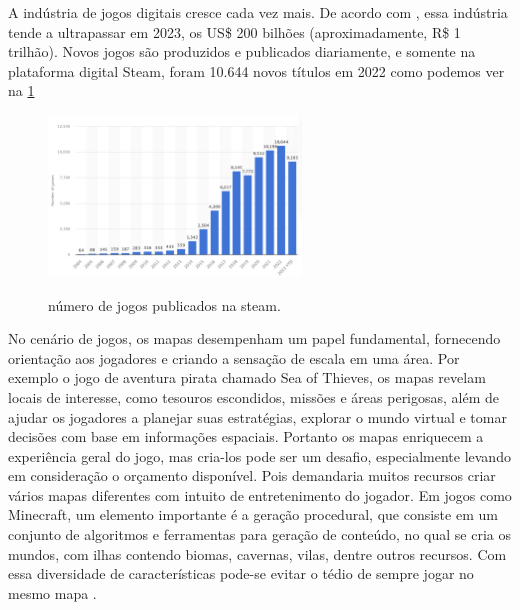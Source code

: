 A indústria de jogos digitais cresce cada vez mais. De acordo com , essa indústria tende a ultrapassar em 2023, os US\$ 200 bilhões (aproximadamente, R\$ 1 trilhão). Novos jogos são produzidos e publicados diariamente, e somente na plataforma digital Steam, foram 10.644 novos títulos em 2022 como podemos ver na \cref{fig:steam_publishes} \space

\begin{figure}[!ht]
	\centering
    \caption{número de jogos publicados na steam.}
	\includegraphics[width=0.6\textwidth]{figures/steam_sales.png}
	\label{fig:steam_publishes}
\end{figure}


No cenário de jogos, os mapas desempenham um papel fundamental, fornecendo orientação aos jogadores e criando a sensação de escala em uma área. Por exemplo o jogo de aventura pirata chamado Sea of Thieves, os mapas revelam locais de interesse, como tesouros escondidos, missões e áreas perigosas, além de ajudar os jogadores a planejar suas estratégias, explorar o mundo virtual e tomar decisões com base em informações espaciais. Portanto os mapas enriquecem a experiência geral do jogo, mas cria-los pode ser um desafio, especialmente levando em consideração o orçamento disponível. Pois demandaria muitos recursos criar vários mapas diferentes com intuito de entretenimento do jogador. Em jogos como Minecraft, um elemento importante é a geração procedural, que consiste em um conjunto de algoritmos e ferramentas para geração de conteúdo, no qual se cria os mundos, com ilhas contendo biomas, cavernas, vilas, dentre outros recursos. Com essa diversidade de características pode-se evitar o tédio de sempre jogar no mesmo mapa \space\cite{video-game-maps, lecafedugeek}.

